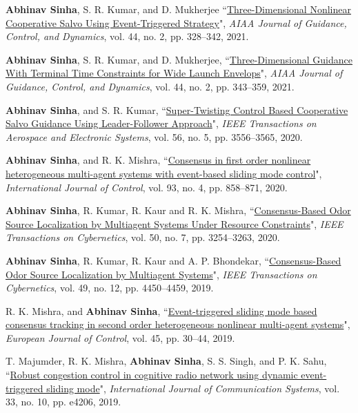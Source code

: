 \begin{etaremune}[leftmargin=1cm]
	\item \textbf{Abhinav Sinha}, S. R. Kumar, and D. Mukherjee ``\href{https://arc.aiaa.org/doi/abs/10.2514/1.G005367}{Three-Dimensional Nonlinear Cooperative Salvo Using Event-Triggered Strategy}", \emph{AIAA Journal of Guidance, Control, and Dynamics}, vol. 44, no. 2, pp. 328--342, 2021.
	\item \textbf{Abhinav Sinha}, S. R. Kumar, and D. Mukherjee, ``\href{https://arc.aiaa.org/doi/abs/10.2514/1.G005180}{Three-Dimensional Guidance With Terminal Time Constraints for Wide Launch Envelops}", \emph{AIAA Journal of Guidance, Control, and Dynamics}, vol. 44, no. 2, pp. 343--359, 2021.
	\item \textbf{Abhinav Sinha}, and S. R. Kumar, ``\href{https://ieeexplore.ieee.org/abstract/document/9000526/}{Super-Twisting Control Based Cooperative Salvo Guidance Using Leader-Follower Approach}", \emph{IEEE Transactions on Aerospace and Electronic Systems}, vol. 56, no. 5, pp. 3556--3565, 2020.
	\item \textbf{Abhinav Sinha}, and R. K. Mishra, ``\href{https://www.tandfonline.com/doi/full/10.1080/00207179.2018.1531147}{Consensus in first order nonlinear heterogeneous multi-agent systems with event-based sliding mode control}", \emph{International Journal of Control}, vol. 93, no. 4, pp. 858--871, 2020.
	\item \textbf{Abhinav Sinha}, R. Kumar, R. Kaur and R. K. Mishra, ``\href{https://ieeexplore.ieee.org/abstract/document/8764615}{Consensus-Based Odor Source Localization by Multiagent Systems Under Resource Constraints}", \emph{IEEE Transactions on Cybernetics}, vol. 50, no. 7, pp. 3254--3263, 2020.
	\item \textbf{Abhinav Sinha}, R. Kumar, R. Kaur and A. P. Bhondekar, ``\href{https://ieeexplore.ieee.org/document/8471102}{Consensus-Based Odor Source Localization by Multiagent Systems}", \emph{IEEE Transactions on Cybernetics}, vol. 49, no. 12, pp. 4450--4459, 2019.
	\item R. K. Mishra, and \textbf{Abhinav Sinha}, ``\href{https://www.sciencedirect.com/science/article/pii/S0947358017303187}{Event-triggered sliding mode based consensus tracking in second order heterogeneous
		nonlinear multi-agent systems}", \emph{European Journal of Control}, vol. 45, pp. 30--44, 2019.
	\item T. Majumder, R. K. Mishra, \textbf{Abhinav Sinha}, S. S. Singh, and P. K. Sahu, ``\href{https://onlinelibrary.wiley.com/doi/abs/10.1002/dac.4206}{Robust congestion control in cognitive radio network using dynamic event-triggered sliding mode}", \emph{International Journal of Communication Systems}, vol. 33, no. 10, pp. e4206, 2019.

\end{etaremune}

